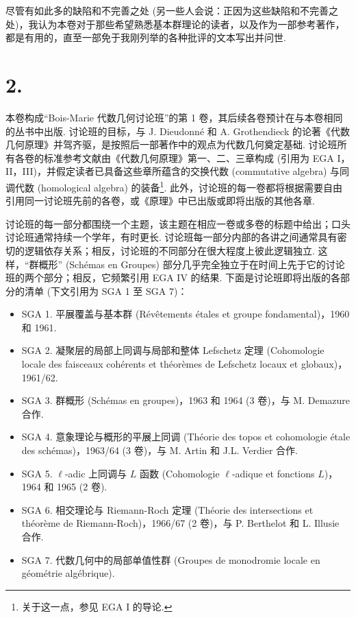 尽管有如此多的缺陷和不完善之处 (另一些人会说：正因为这些缺陷和不完善之处)，我认为本卷对于那些希望熟悉基本群理论的读者，以及作为一部参考著作，都是有用的，直至一部免于我刚列举的各种批评的文本写出并问世.

\section*{2.}

本卷构成``Bois-Marie 代数几何讨论班''的第 1 卷，其后续各卷预计在与本卷相同的丛书中出版. 讨论班的目标，与 J. Dieudonné 和 A. Grothendieck 的论著《代数几何原理》并驾齐驱，是按照后一部著作中的观点为代数几何奠定基础. 讨论班所有各卷的标准参考文献由《代数几何原理》第一、二、三章构成 (引用为 EGA I，II，III)，并假定读者已具备这些章所蕴含的交换代数 (commutative algebra) 与同调代数 (homological algebra) 的装备\footnote{关于这一点，参见 EGA I 的导论.}. 此外，讨论班的每一卷都将根据需要自由引用同一讨论班先前的各卷，或《原理》中已出版或即将出版的其他各章.

讨论班的每一部分都围绕一个主题，该主题在相应一卷或多卷的标题中给出；口头讨论班通常持续一个学年，有时更长. 讨论班每一部分内部的各讲之间通常具有密切的逻辑依存关系；相反，讨论班的不同部分在很大程度上彼此逻辑独立. 这样，``群概形'' (Schémas en Groupes) 部分几乎完全独立于在时间上先于它的讨论班的两个部分；相反，它频繁引用 EGA IV 的结果. 下面是讨论班即将出版的各部分的清单 (下文引用为 SGA 1 至 SGA 7)：

\begin{itemize}\tightlist
\item SGA 1. 平展覆盖与基本群 (Révêtements étales et groupe fondamental)，1960 和 1961.
\item SGA 2. 凝聚层的局部上同调与局部和整体 Lefschetz 定理 (Cohomologie locale des faisceaux cohérents et théorèmes de Lefschetz locaux et globaux)，1961/62.
\item SGA 3. 群概形 (Schémas en groupes)，1963 和 1964 (3 卷)，与 M. Demazure 合作.
\item SGA 4. 意象理论与概形的平展上同调 (Théorie des topos et cohomologie étale des schémas)，1963/64 (3 卷)，与 M. Artin 和 J.L. Verdier 合作.
\item SGA 5. $\ell$-adic 上同调与 $L$ 函数 (Cohomologie $\ell$-adique et fonctions $L$)，1964 和 1965 (2 卷).
\item SGA 6. 相交理论与 Riemann-Roch 定理 (Théorie des intersections et théorème de Riemann-Roch)，1966/67 (2 卷)，与 P. Berthelot 和 L. Illusie 合作.
\item SGA 7. 代数几何中的局部单值性群 (Groupes de monodromie locale en géométrie algébrique).
\end{itemize}

